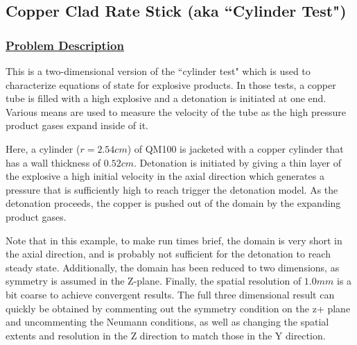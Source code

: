 \subsection*{\center Copper Clad Rate Stick (aka ``Cylinder Test")}
\subsubsection*{\underline{Problem Description}}

This is a two-dimensional version of the ``cylinder test" which is used to
characterize equations of state for explosive products.  In those tests, a
copper tube is filled with a high explosive and a detonation is initiated
at one end.  Various means are used to measure the velocity of the tube as
the high pressure product gases expand inside of it.

Here, a cylinder ($r=2.54 cm$) of QM100 is jacketed with a copper cylinder
that has a wall thickness of $0.52 cm.$   Detonation is initiated by giving
a thin layer of the explosive a high initial velocity in the axial direction
which generates a pressure that is sufficiently high to reach trigger the
detonation model.  As the detonation proceeds, the copper is pushed out of
the domain by the expanding product gases.

Note that in this example, to make run times brief, the domain is very short
in the axial direction, and is probably not sufficient for the detonation to
reach steady state.  Additionally, the domain has been reduced to two
dimensions, as symmetry is assumed in the Z-plane.  Finally, the spatial
resolution of $1.0 mm$ is a bit coarse to achieve 
convergent results.  The full three dimensional result can quickly be
obtained by commenting out the symmetry condition on the z+ plane and
uncommenting the Neumann conditions, as well as changing the spatial extents
and resolution in the Z direction to match those in the Y direction.

%
